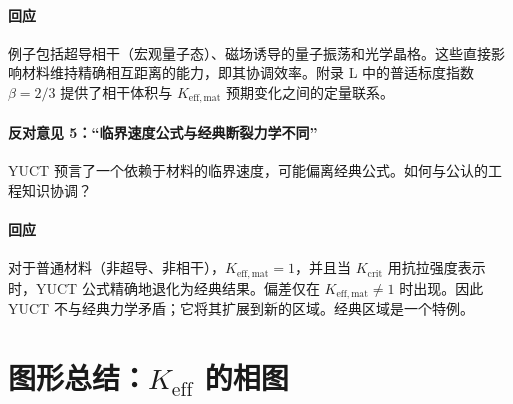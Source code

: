 \documentclass[12pt,a4paper]{article}
\newcommand{\betaf}{\beta}
\newcommand{\Kcrit}{K_{\mathrm{crit}}}
\begin{document}
	\paragraph{回应}
	例子包括超导相干（宏观量子态）、磁场诱导的量子振荡和光学晶格。这些直接影响材料维持精确相互距离的能力，即其协调效率。附录 L 中的普适标度指数 \(\betaf = 2/3\) 提供了相干体积与 \(K_{\mathrm{eff,mat}}\) 预期变化之间的定量联系。
	
	\paragraph{反对意见 5：“临界速度公式与经典断裂力学不同”}
	YUCT 预言了一个依赖于材料的临界速度，可能偏离经典公式。如何与公认的工程知识协调？
	
	\paragraph{回应}
	对于普通材料（非超导、非相干），\(K_{\mathrm{eff,mat}} = 1\)，并且当 \(\Kcrit\) 用抗拉强度表示时，YUCT 公式精确地退化为经典结果。偏差仅在 \(K_{\mathrm{eff,mat}} \neq 1\) 时出现。因此 YUCT 不与经典力学矛盾；它将其扩展到新的区域。经典区域是一个特例。
	
	\section{图形总结：\(K_{\mathrm{eff}}\) 的相图}
	\label{sec:diagram}
	
\end{document}
